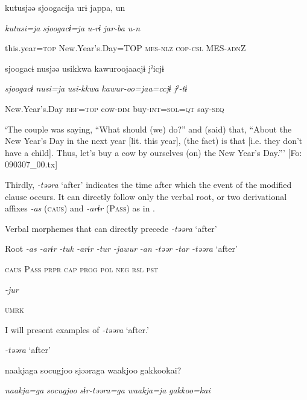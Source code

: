       kutusjəə  sjoogacɨja  urɨ  jappa,  un

      \textit{kutusi=ja}  \textit{sjoogacɨ=ja}  \textit{u-rɨ}  \textit{jar-ba}  \textit{u-n}

      this.year=\textsc{top}  New.Year’s.Day=TOP  \textsc{mes}-\textsc{nlz}  \textsc{cop}-\textsc{csl}  MES-\textsc{adn}Z

      sjoogacɨ  nusjəə  usikkwa  kawuroojaacjɨ  jˀicjɨ

      \textit{sjoogacɨ}  \textit{nusi=ja}  \textit{usi-kkwa}  \textit{kawur-oo=jaa=ccjɨ}  \textit{jˀ-tɨ}

      New.Year’s.Day  \textsc{ref}=\textsc{top}  cow-\textsc{dim}  buy-\textsc{int}=\textsc{sol}=\textsc{qt}  say-\textsc{seq}

\glt ‘The couple was saying, “What should (we) do?” and (said) that, “About the New Year’s Day in the next year [lit. this year], (the fact) is that [i.e. they don’t have a child]. Thus, let’s buy a cow by ourselves (on) the New Year’s Day.”’ [Fo: 090307\_00.tx]

  Thirdly, \textit{{}-təəra} ‘after’ indicates the time after which the event of the modified clause occurs. It can directly follow only the verbal root, or two derivational affixes \textit{{}-as} (\textsc{caus}) and \textit{{}-arɨr} (P\textsc{ass}) as in .

\ea\label{ex:8-99}
  Verbal morphemes that can directly precede \textit{{}-təəra} ‘after’

  Root  \textit{{}-as  {}-arɨr} %
\textit{{}-tuk  {}-arɨr  {}-tur  {}-jawur} %
\textit{{}-an  {}-təər  {}-tar  {}-təəra} ‘after’

    \textsc{caus}  P\textsc{ass}  \textsc{prpr}  \textsc{cap}  \textsc{prog}  \textsc{pol}  \textsc{neg}  \textsc{rsl}  \textsc{pst}

          \textit{{}-jur} 

          \textsc{umrk}

I will present examples of \textit{{}-təəra} ‘after.’

\ea\label{ex:8-100}
  \textit{{}-təəra} ‘after’

\ea [= (\ref{ex:6-117}d)]

    {\TM}
\glll  naakjaga  {\textbar}socugjoo{\textbar}  sjəəraga  waakjoo  {\textbar}gakkoo{\textbar}kai?

      \textit{naakja=ga}  \textit{socugjoo}  \textit{sɨr-təəra=ga}  \textit{waakja=ja}  \textit{gakkoo=kai}

